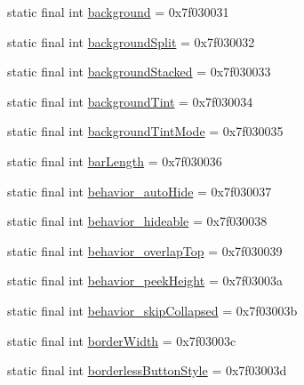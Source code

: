 \begin{DoxyCompactItemize}
\item 
static final int \mbox{\hyperlink{classandroid_1_1support_1_1design_1_1R_1_1attr_a633e86200cd9774275242631c63985ee}{background}} = 0x7f030031
\item 
static final int \mbox{\hyperlink{classandroid_1_1support_1_1design_1_1R_1_1attr_ac7943a5fbb475fbbfe90e0a5a6622afb}{background\+Split}} = 0x7f030032
\item 
static final int \mbox{\hyperlink{classandroid_1_1support_1_1design_1_1R_1_1attr_a67ec9129f83e25973c54736f26ebb03b}{background\+Stacked}} = 0x7f030033
\item 
static final int \mbox{\hyperlink{classandroid_1_1support_1_1design_1_1R_1_1attr_aa714e7de34a4c22bd4a43350611f6424}{background\+Tint}} = 0x7f030034
\item 
static final int \mbox{\hyperlink{classandroid_1_1support_1_1design_1_1R_1_1attr_a5c4554ea65007751ccc0078bde491065}{background\+Tint\+Mode}} = 0x7f030035
\item 
static final int \mbox{\hyperlink{classandroid_1_1support_1_1design_1_1R_1_1attr_aed76efd8f3192670d26289e5d1a6a94e}{bar\+Length}} = 0x7f030036
\item 
static final int \mbox{\hyperlink{classandroid_1_1support_1_1design_1_1R_1_1attr_ae6f0cad2e8e6fae4a352cfb5632ef478}{behavior\+\_\+auto\+Hide}} = 0x7f030037
\item 
static final int \mbox{\hyperlink{classandroid_1_1support_1_1design_1_1R_1_1attr_adf7a41388cc8e5a7f86a64a79d7a85dd}{behavior\+\_\+hideable}} = 0x7f030038
\item 
static final int \mbox{\hyperlink{classandroid_1_1support_1_1design_1_1R_1_1attr_a6bd3a8ada6445384f29a7b94a7679090}{behavior\+\_\+overlap\+Top}} = 0x7f030039
\item 
static final int \mbox{\hyperlink{classandroid_1_1support_1_1design_1_1R_1_1attr_ad10467c4b1c49d1ee143f735c64a16fb}{behavior\+\_\+peek\+Height}} = 0x7f03003a
\item 
static final int \mbox{\hyperlink{classandroid_1_1support_1_1design_1_1R_1_1attr_aff8d1708123c2c9612b66c0fdcb20e45}{behavior\+\_\+skip\+Collapsed}} = 0x7f03003b
\item 
static final int \mbox{\hyperlink{classandroid_1_1support_1_1design_1_1R_1_1attr_a0b9b9703ae190c90c9130ba940edfe1a}{border\+Width}} = 0x7f03003c
\item 
static final int \mbox{\hyperlink{classandroid_1_1support_1_1design_1_1R_1_1attr_af2eab970fb1e3e757b04a40b2552d82e}{borderless\+Button\+Style}} = 0x7f03003d
\item 

\end{DoxyCompactItemize}
